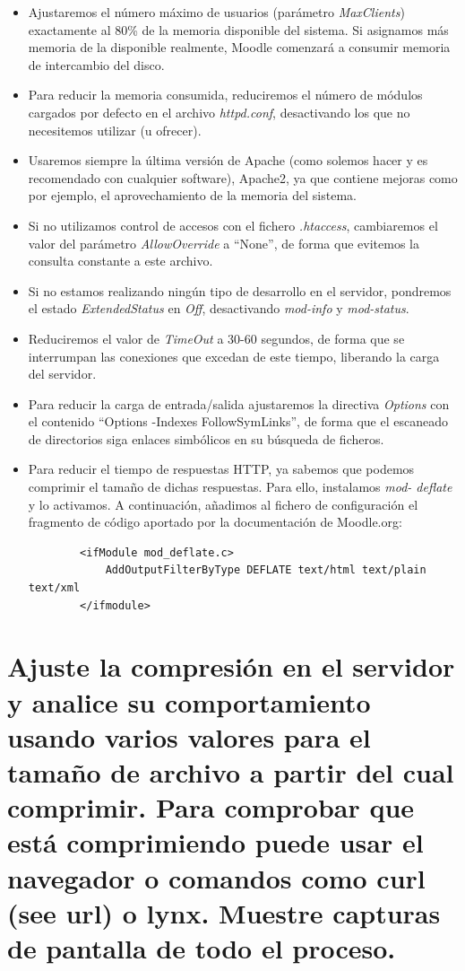 	\begin{itemize}
		\item Ajustaremos el número máximo de usuarios (parámetro \emph{MaxClients}) exactamente al 80\% de la memoria disponible del sistema. Si asignamos más memoria de la disponible realmente, Moodle comenzará a consumir memoria de intercambio del disco.
		\item Para reducir la memoria consumida, reduciremos el número de módulos cargados por defecto en el archivo \emph{httpd.conf}, desactivando los que no necesitemos utilizar (u ofrecer).
		\item Usaremos siempre la última versión de Apache (como solemos hacer y es recomendado con cualquier software), Apache2, ya que contiene mejoras como por ejemplo, el aprovechamiento de la memoria del sistema.
		\item Si no utilizamos control de accesos con el fichero \emph{.htaccess}, cambiaremos el valor del parámetro \emph{AllowOverride} a ``None'', de forma que evitemos la consulta constante a este archivo.
		\item Si no estamos realizando ningún tipo de desarrollo en el servidor, pondremos el estado \emph{ExtendedStatus} en \emph{Off}, desactivando \emph{mod-info} y \emph{mod-status}.
		\item Reduciremos el valor de \emph{TimeOut} a 30-60 segundos, de forma que se interrumpan las conexiones que excedan de este tiempo, liberando la carga del servidor.
		\item Para reducir la carga de entrada/salida ajustaremos la directiva \emph{Options} con el contenido ``Options -Indexes FollowSymLinks'', de forma que el escaneado de directorios siga enlaces simbólicos en su búsqueda de ficheros.
		\item Para reducir el tiempo de respuestas HTTP, ya sabemos que podemos comprimir el tamaño de dichas respuestas. Para ello, instalamos \emph{mod- deflate} \cite{mod-deflate} y lo activamos. A continuación, añadimos al fichero de configuración el fragmento de código aportado por la documentación de Moodle.org:
		\begin{verbatim}
		<ifModule mod_deflate.c>
  		    AddOutputFilterByType DEFLATE text/html text/plain text/xml
		</ifmodule>
		\end{verbatim}
	\end{itemize}


\section{Ajuste la compresión en el servidor y analice su comportamiento usando varios valores para el tamaño de archivo a partir del cual comprimir. Para comprobar que está comprimiendo puede usar el navegador o comandos como curl (see url) o lynx. Muestre capturas de pantalla de todo el proceso.}


